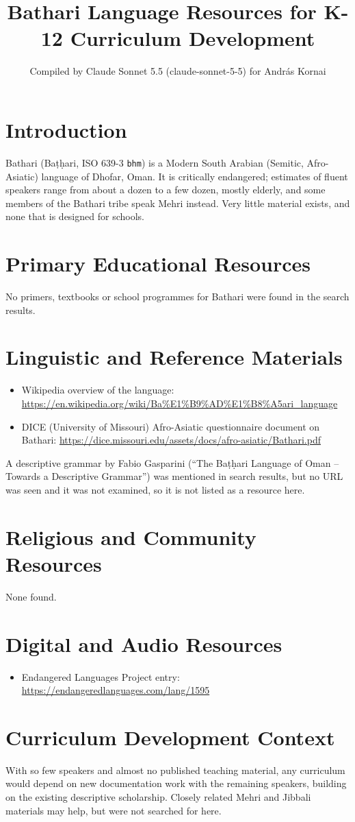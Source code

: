 \documentclass[12pt]{article}
\title{Bathari Language Resources for K-12 Curriculum Development}
\author{Compiled by Claude Sonnet 5.5 (claude-sonnet-5-5) for Andr\'as Kornai}
\date{}
\begin{document}
\maketitle

\section{Introduction}
Bathari (Ba\d{t}\d{h}ari, ISO 639-3 \texttt{bhm}) is a Modern South Arabian (Semitic, Afro-Asiatic) language of Dhofar, Oman. It is critically endangered; estimates of fluent speakers range from about a dozen to a few dozen, mostly elderly, and some members of the Bathari tribe speak Mehri instead. Very little material exists, and none that is designed for schools.

\section{Primary Educational Resources}
No primers, textbooks or school programmes for Bathari were found in the search results.

\section{Linguistic and Reference Materials}
\begin{itemize}
\item Wikipedia overview of the language: \url{https://en.wikipedia.org/wiki/Ba%E1%B9%AD%E1%B8%A5ari_language}
\item DICE (University of Missouri) Afro-Asiatic questionnaire document on Bathari: \url{https://dice.missouri.edu/assets/docs/afro-asiatic/Bathari.pdf}
\end{itemize}
A descriptive grammar by Fabio Gasparini (``The Ba\d{t}\d{h}ari Language of Oman -- Towards a Descriptive Grammar'') was mentioned in search results, but no URL was seen and it was not examined, so it is not listed as a resource here.

\section{Religious and Community Resources}
None found.

\section{Digital and Audio Resources}
\begin{itemize}
\item Endangered Languages Project entry: \url{https://endangeredlanguages.com/lang/1595}
\end{itemize}

\section{Curriculum Development Context}
With so few speakers and almost no published teaching material, any curriculum would depend on new documentation work with the remaining speakers, building on the existing descriptive scholarship. Closely related Mehri and Jibbali materials may help, but were not searched for here.
\end{document}
